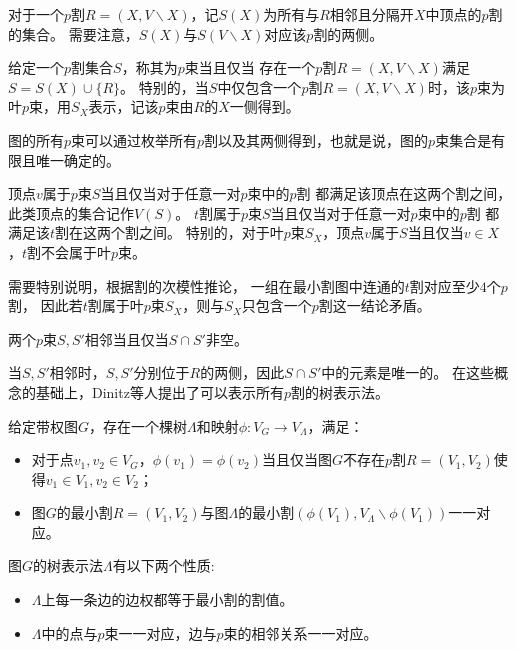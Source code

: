 对于一个$p$割$R=(X,V\backslash X)$，记$S(X)$为所有与$R$相邻且分隔开$X$中顶点的$p$割的集合。
需要注意，$S(X)$与$S(V\backslash X)$对应该$p$割的两侧。

\begin{definition}[$p$束]
  给定一个$p$割集合$S$，称其为$p$束当且仅当
  存在一个$p$割$R=(X,V\backslash X)$满足$S=S(X)\cup \{R\}$。
  特别的，当$S$中仅包含一个$p$割$R=(X,V\backslash X)$时，该$p$束为叶$p$束，用$S_X$表示，记该$p$束由$R$的$X$一侧得到。
\end{definition}
图的所有$p$束可以通过枚举所有$p$割以及其两侧得到，也就是说，图的$p$束集合是有限且唯一确定的。

\begin{definition}[$p$束内部的顶点和$t$割]
  顶点$v$属于$p$束$S$当且仅当对于任意一对$p$束中的$p$割
  都满足该顶点在这两个割之间，
  此类顶点的集合记作$V(S)$。
  $t$割属于$p$束$S$当且仅当对于任意一对$p$束中的$p$割
  都满足该$t$割在这两个割之间。
  特别的，对于叶$p$束$S_X$，顶点$v$属于$S$当且仅当$v\in X$，$t$割不会属于叶$p$束。
\end{definition}
需要特别说明，根据割的次模性推论，
一组在最小割图中连通的$t$割对应至少$4$个$p$割，
因此若$t$割属于叶$p$束$S_X$，则与$S_X$只包含一个$p$割这一结论矛盾。
\begin{definition}[相邻的$p$束]
  两个$p$束$S,S'$相邻当且仅当$S\cap S'$非空。
\end{definition}
当$S,S'$相邻时，$S,S'$分别位于$R$的两侧，因此$S\cap S'$中的元素是唯一的。
在这些概念的基础上，Dinitz等人提出了可以表示所有$p$割的树表示法。

\begin{theorem}[树表示法]\cite{dinitz1976structure}
  \label{treerepresentation}
  给定带权图$G$，存在一个棵树$\Lambda$和映射$\phi:V_G\rightarrow V_\Lambda$，满足：
    \begin{itemize}
        \item 对于点$v_1,v_2\in V_G$，$\phi(v_1)=\phi(v_2)$当且仅当图$G$不存在$p$割$R=(V_1,V_2)$使得$v_1\in V_1,v_2\in V_2$；
        \item 图$G$的最小割$R=(V_1,V_2)$与图$\Lambda$的最小割$(\phi(V_1),V_\Lambda\backslash\phi(V_1))$一一对应。
    \end{itemize}
\end{theorem}

\begin{theorem}[树表示法的性质]\cite{dinitz1976structure}
  \label{treerepresentation2}
  图$G$的树表示法$\Lambda$有以下两个性质:
  \begin{itemize}
    \item $\Lambda$上每一条边的边权都等于最小割的割值。
    \item $\Lambda$中的点与$p$束一一对应，边与$p$束的相邻关系一一对应。
  \end{itemize}
\end{theorem}

